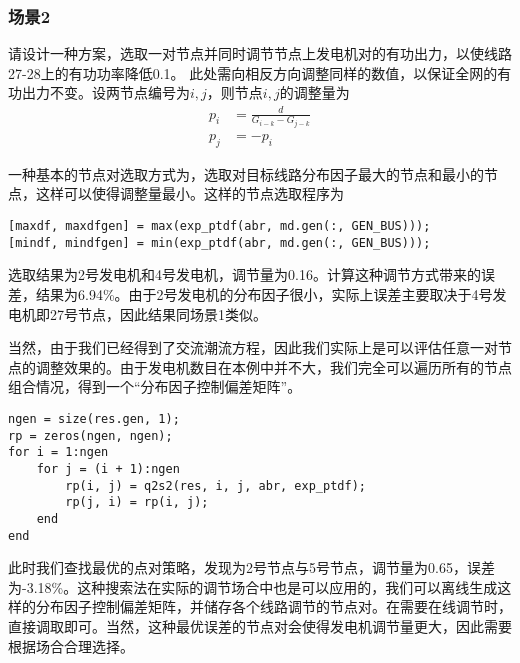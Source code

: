 \documentclass[a4paper,12pt]{article}
\begin{document}
    \subsubsection{场景2} 请设计一种方案，选取一对节点并同时调节节点上发电机对的有功出力，以使线路27-28上的有功功率降低0.1。
    此处需向相反方向调整同样的数值，以保证全网的有功出力不变。设两节点编号为$i,j$，则节点$i,j$的调整量为
    \begin{equation}
      \label{eq:q3ij}
      \begin{aligned}
        p_i &= \frac{d}{G_{i-k} - G_{j-k}}\\
        p_j &= - p_i
      \end{aligned}
    \end{equation}

    一种基本的节点对选取方式为，选取对目标线路分布因子最大的节点和最小的节点，这样可以使得调整量最小。这样的节点选取程序为
    \begin{lstlisting}[style=Matlab-editor,basicstyle=\mlttfamily]
[maxdf, maxdfgen] = max(exp_ptdf(abr, md.gen(:, GEN_BUS)));
[mindf, mindfgen] = min(exp_ptdf(abr, md.gen(:, GEN_BUS)));
    \end{lstlisting}
    选取结果为2号发电机和4号发电机，调节量为0.16。计算这种调节方式带来的误差，结果为6.94\%。由于2号发电机的分布因子很小，实际上误差主要取决于4号发电机即27号节点，因此结果同场景1类似。

    当然，由于我们已经得到了交流潮流方程，因此我们实际上是可以评估任意一对节点的调整效果的。由于发电机数目在本例中并不大，我们完全可以遍历所有的节点组合情况，得到一个“分布因子控制偏差矩阵”。
    \begin{lstlisting}[style=Matlab-editor,basicstyle=\mlttfamily]
ngen = size(res.gen, 1);
rp = zeros(ngen, ngen);
for i = 1:ngen
    for j = (i + 1):ngen
        rp(i, j) = q2s2(res, i, j, abr, exp_ptdf);
        rp(j, i) = rp(i, j);
    end
end
    \end{lstlisting}

    此时我们查找最优的点对策略，发现为2号节点与5号节点，调节量为0.65，误差为-3.18\%。这种搜索法在实际的调节场合中也是可以应用的，我们可以离线生成这样的分布因子控制偏差矩阵，并储存各个线路调节的节点对。在需要在线调节时，直接调取即可。当然，这种最优误差的节点对会使得发电机调节量更大，因此需要根据场合合理选择。
    
    
    \appendix
\end{document}
